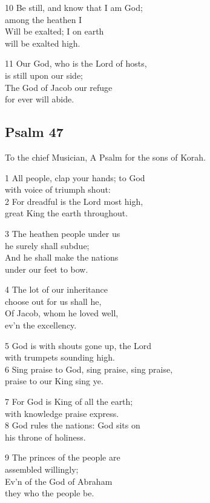 \begin{multicols}{3}
10 Be still, and know that I am God;\\
among the heathen I\\
Will be exalted; I on earth\\
will be exalted high.

11 Our God, who is the Lord of hosts,\\
is still upon our side;\\
The God of Jacob our refuge\\
for ever will abide.

\begin{center}
\quad{}\quad{}
\end{center}

\subsection*{Psalm 47}

To the chief Musician,
A Psalm for the sons of Korah.

1 All people, clap your hands; to God\\
with voice of triumph shout:\\
2 For dreadful is the Lord most high,\\
great King the earth throughout.

3 The heathen people under us\\
he surely shall subdue;\\
And he shall make the nations\\
under our feet to bow.

4 The lot of our inheritance\\
choose out for us shall he,\\
Of Jacob, whom he loved well,\\
ev’n the excellency.

5 God is with shouts gone up, the Lord\\
with trumpets sounding high.\\
6 Sing praise to God, sing praise, sing praise,\\
praise to our King sing ye.

7 For God is King of all the earth;\\
with knowledge praise express.\\
8 God rules the nations: God sits on\\
his throne of holiness.

9 The princes of the people are\\
assembled willingly;\\
Ev’n of the God of Abraham\\
they who the people be.


\end{multicols}
